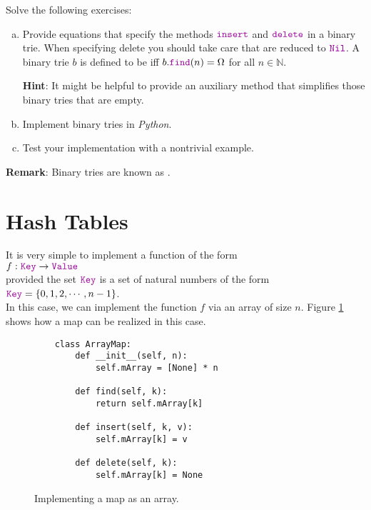 Solve the following exercises:
\begin{enumerate}[(a)]
\item Provide equations that specify the methods $\mytt{insert}$ and $\mytt{delete}$ in a binary trie.
      When specifying delete you should take care that  are reduced to
      $\mytt{Nil}$.  A binary trie $b$ is defined to be  iff $b.\mytt{find}(n) = \Omega$ for all $n \in \mathbb{N}$.

      \textbf{Hint}:  It might be helpful to provide an auxiliary method that simplifies those binary tries
      that are empty. 
\item Implement binary tries in \textsl{Python}.
\item Test your implementation with a nontrivial example.
\end{enumerate}
\textbf{Remark}: Binary tries are known as .  \eox

\section{Hash Tables}
It is very simple to implement a function of the form \\[0.2cm]
\hspace*{1.3cm} $f: \mytt{Key} \rightarrow \mytt{Value}$ \\[0.2cm]
provided the set $\mytt{Key}$ is a set of natural numbers of the form  \\[0.2cm]
\hspace*{1.3cm} $\mytt{Key} = \{ 0, 1, 2, \cdots, n-1 \}$. \\[0.2cm]
In this case, we can implement the function $f$ via an array of size $n$.
Figure \ref{fig:map-array.ipython} shows how a map can be realized in this case.

\begin{figure}[!ht]
\centering
\begin{verbatim}
    class ArrayMap:
        def __init__(self, n):
            self.mArray = [None] * n
            
        def find(self, k):
            return self.mArray[k]
        
        def insert(self, k, v):
            self.mArray[k] = v
    
        def delete(self, k):
            self.mArray[k] = None
\end{verbatim}
\vspace*{-0.3cm}
\caption{Implementing a map as an array.}
\label{fig:map-array.ipython}
\end{figure}


